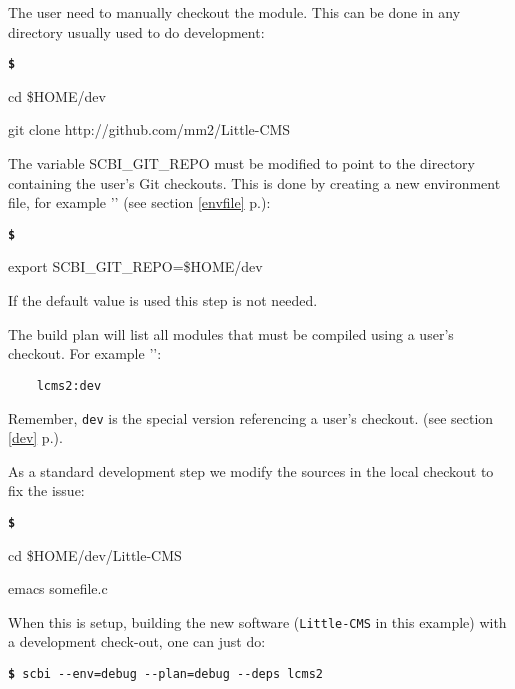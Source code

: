\documentclass[a4paper,12pt,twoside]{article}
\newenvironment{shellcommand}{
	\begin{list}{ %
			\bfseries\texttt \$
		}{ %
			\ttfamily
			\setlength{\topsep}{-0.3ex}
			\setlength{\labelwidth}{1in}
			\setlength{\leftmargin}{0.7in}
			\setlength{\labelsep}{0.5ex}
			\setlength{\rightmargin}{0.5in}
			\setlength{\itemsep}{1ex}
			\setlength{\parsep}{0ex}
			\setlength{\listparindent}{0.5in}
		}
	}{
	\end{list}
}
\newcommand{\code}[1]{\texttt{#1}}
\newcommand{\seeref}[1]{see section \ref{#1} p.\pageref{#1}}
\newcommand{\file}[1]{'{\path{#1}}'}
\newcommand{\cmd}[1]{\tabto{1cm}\hspace{0.5cm}\texttt{\textbf{\$} #1}}
\newcommand{\ddash}{-{}-}
\begin{document}
\begin{description}[style=nextline]
	\item[Checkout the module] The user need to manually checkout the module. This can be done in any directory usually used to do development:

	\begin{shellcommand}
	\item cd \$HOME/dev
	\item git clone http://github.com/mm2/Little-CMS
	\end{shellcommand}

	\item[Setup SCBI enviroment] The variable SCBI\_GIT\_REPO must be modified to point to the directory containing the user's Git checkouts. This is done by creating a new environment file, for example \file{.env-debug} (\seeref{envfile}):

	\begin{shellcommand}
	\item export SCBI\_GIT\_REPO=\$HOME/dev
	\end{shellcommand}

	If the default value is used this step is not needed.

	\item[Create a build plan] The build plan will list all modules that must be compiled using a user's checkout. For example \file{.plan-debug}:

	\begin{lstlisting}
	lcms2:dev
	\end{lstlisting}

	Remember, \code{dev} is the special version referencing a user's checkout. (\seeref{dev}).

	\item[Modify the module's sources] As a standard development step we modify the sources in the local checkout to fix the issue:

	\begin{shellcommand}
	\item cd \$HOME/dev/Little-CMS
	\item emacs somefile.c
	\end{shellcommand}

\end{description}

When this is setup, building the new software (\code{Little-CMS} in this example) with a development check-out, one can just do:

\cmd{scbi \ddash{}env=debug \ddash{}plan=debug \ddash{}deps lcms2}
\end{document}
